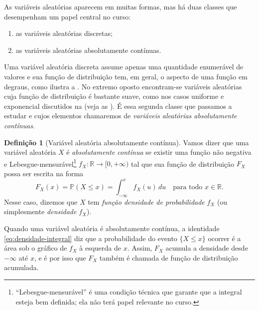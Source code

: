 \documentclass[12pt,portuguese]{article}
\theoremstyle{definition}
\newtheorem{definition}[definition]{Definição}
\theoremstyle{plainexercise}
\theoremstyle{starredexercise}
\theoremstyle{definition}
\begin{document}
As variáveis aleatórias aparecem em muitas formas, mas há duas classes que
desempenham um papel central no curso:

\begin{enumerate}[label=\Roman*.]
  \item as variáveis aleatórias discretas;
  \item as variáveis aleatórias absolutamente contínuas.
\end{enumerate}

Uma variável aleatória discreta assume apenas uma quantidade enumerável de
valores e sua função de distribuição tem, em geral, o aspecto de uma função
em degraus, como ilustra a . No extremo oposto
encontram-se variáveis aleatórias cuja função de distribuição é bastante
suave, como nos casos uniforme e exponencial discutidos na
 (veja as ).
É essa segunda classe que passamos a estudar e cujos elementos chamaremos de
\emph{variáveis aleatórias absolutamente contínuas}.

\begin{definition}[Variável aleatória absolutamente contínua]\label{def:va-continua}
  Vamos dizer que uma variável aleatória $X$ é \emph{absolutamente contínua} se existir uma
  função não negativa e Lebesgue-mensurável\footnote{``Lebesgue-mensurável'' é uma condição
  técnica que garante que a integral esteja bem definida;
  ela não terá papel relevante no curso.} $f_X:\mathbb{R}\to [0,+\infty)$
  tal que sua função de distribuição $F_X$ possa
  ser escrita na forma
  \begin{equation}\label{eq:densidade-integral}
    F_X(x) = \mathbb{P}(X \leqslant x) = \int_{-\infty}^{x} f_X(u)\,du
    \quad \text{para todo } x \in \mathbb{R}.
  \end{equation}
  Nesse caso, dizemos que $X$ tem \emph{função densidade de probabilidade} $f_X$
  (ou simplesmente \emph{densidade} $f_X$).
  \end{definition}

Quando uma variável aleatória é absolutamente
contínua, a identidade \eqref{eq:densidade-integral} diz que a probabilidade do evento
$\{X \leqslant x\}$ ocorrer é a área sob o gráfico de $f_X$ à esquerda de
$x$. Assim, $F_X$ acumula a densidade desde $-\infty$ até $x$, e é por isso
que $F_X$ também é chamada de função de distribuição acumulada.
\end{document}

